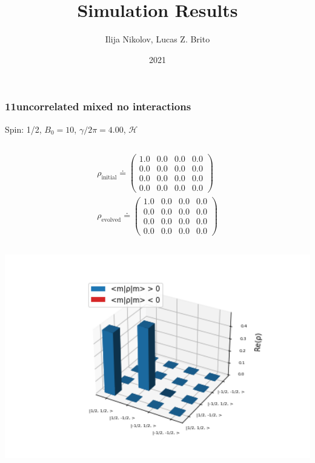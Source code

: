 \documentclass[10pt]{beamer}
\title{Simulation Results}
\author{Ilija Nikolov, Lucas Z. Brito}
\institute{}
\date{2021}
\begin{document}
\frame{\titlepage}

\begin{frame}
\frametitle{11uncorrelated mixed no interactions}
Spin: 1/2, $B_0= 10$, $\gamma/2\pi = 4.00$, $\mathcal{H}$
\begin{columns}[T]
    \begin{column}{.5\textwidth}
\begin{align*}
	\rho_{\text{initial}}\doteq
	\begin{pmatrix}
	1.0 & 0.0 & 0.0 & 0.0 \\
	0.0 & 0.0 & 0.0 & 0.0 \\
	0.0 & 0.0 & 0.0 & 0.0 \\
	0.0 & 0.0 & 0.0 & 0.0
	\end{pmatrix}\\
	\rho_{\text{evolved}}\doteq 
	\begin{pmatrix}
	1.0 & 0.0 & 0.0 & 0.0 \\
	0.0 & 0.0 & 0.0 & 0.0 \\
	0.0 & 0.0 & 0.0 & 0.0 \\
	0.0 & 0.0 & 0.0 & 0.0
	\end{pmatrix}
\end{align*}
\begin{column}{.5\textwidth}
	\includegraphics[width=1.5\textwidth]{simulation_results/spin1-2/11uncorrelated_mixed_no_interactions/InitialRealPartDensityMatrix.png}
\end{column}
\begin{column}{.5\textwidth}

\end{column}
\end{column}
\end{columns}
\end{frame}
\end{document}
